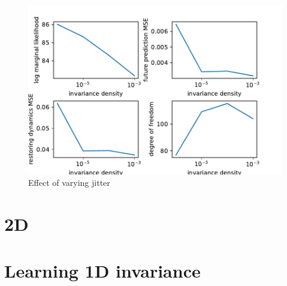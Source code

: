 \documentclass{statsmsc}
\begin{document}
\begin{figure}[H] 
  \includegraphics[width=0.6\linewidth]{../codes/figures/vary_jitter_density.pdf}
  \centering
  \caption{Effect of varying jitter}
  \label{fig:vary_jitter}
\end{figure}

\section{2D}

\section{Learning 1D invariance}
\end{document}
